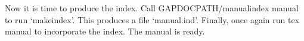 Now it is time to produce the index. Call
\begintt
GAPDOCPATH/manualindex manual
\endtt
to run `makeindex'. This produces a file `manual.ind'. Finally, once again
run
\begintt
tex manual
\endtt
to incorporate the index. The manual is ready.

